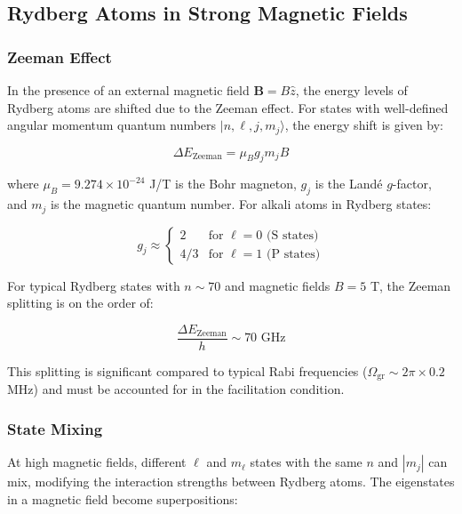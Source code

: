 \subsection*{Rydberg Atoms in Strong Magnetic Fields}

\subsubsection{Zeeman Effect}

In the presence of an external magnetic field $\mathbf{B} = B \hat{z}$, the energy levels of Rydberg atoms are shifted due to the Zeeman effect. For states with well-defined angular momentum quantum numbers $|n,\ell,j,m_j\rangle$, the energy shift is given by:

\begin{equation}
    \Delta E_{\mathrm{Zeeman}} = \mu_B g_j m_j B
    \label{eq:zeeman_shift}
\end{equation}

where $\mu_B = 9.274 \times 10^{-24}$ J/T is the Bohr magneton, $g_j$ is the Landé $g$-factor, and $m_j$ is the magnetic quantum number. For alkali atoms in Rydberg states:

\begin{equation}
    g_j \approx \begin{cases}
        2 & \text{for } \ell = 0 \text{ (S states)} \\
        4/3 & \text{for } \ell = 1 \text{ (P states)}
    \end{cases}
    \label{eq:lande_g}
\end{equation}

For typical Rydberg states with $n \sim 70$ and magnetic fields $B = 5$ T, the Zeeman splitting is on the order of:

\begin{equation}
    \frac{\Delta E_{\mathrm{Zeeman}}}{h} \sim 70 \text{ GHz}
    \label{eq:zeeman_typical}
\end{equation}

This splitting is significant compared to typical Rabi frequencies ($\Omega_{\mathrm{gr}} \sim 2\pi \times 0.2$ MHz) and must be accounted for in the facilitation condition.
\subsubsection{State Mixing}
\label{sec:zeeman_correction}

At high magnetic fields, different $\ell$ and $m_\ell$ states with the same $n$ and $|m_j|$ can mix, modifying the interaction strengths between Rydberg atoms. The eigenstates in a magnetic field become superpositions:

